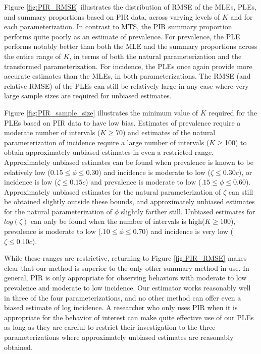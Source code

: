 \documentclass[man, noextraspace, floatsintext]{apa6}\usepackage[]{graphicx}\usepackage[]{color}
\begin{document}
Figure \ref{fig:PIR_RMSE} illustrates the distribution of RMSE of the MLEs, PLEs, and summary proportions based on PIR data, across varying levels of $K$ and for each parameterization. 
In contrast to MTS, the PIR summary proportion performs quite poorly as an estimate of prevalence. 
For prevalence, the PLE performs notably better than both the MLE and the summary proportions across the entire range of $K$, in terms of both the natural parameterization and the transformed parameterization. 
For incidence, the PLEs once again provide more accurate estimates than the MLEs, in both parameterizations. The RMSE (and relative RMSE) of the PLEs can still be relatively large in any case where very large sample sizes are required for unbiased estimates.

Figure \ref{fig:PIR_sample_size} illustrates the minimum value of $K$ required for the PLEs based on PIR data to have low bias. Estimates of prevalence require a moderate number of intervals ($K \geq 70$) and estimates of the natural parameterization of incidence require a large number of intervals ($K \geq $100) to obtain approximately unbiased estimates in even a restricted range. Approximately unbiased estimates can be found when prevalence is known to be relatively low ($0.15 \leq \phi \leq 0.30$) and incidence is moderate to low ($\zeta \leq 0.30c$), or incidence is low ($\zeta \leq 0.15c$) and prevalence is moderate to low ($.15 \leq \phi \leq 0.60$). Approximately unbiased estimates for the natural parameterization of $\zeta$ can still be obtained slightly outside these bounds, and approximately unbiased estimates for the natural parameterization of $\phi$ slightly farther still. Unbiased estimates for $log(\zeta)$ can only be found when the number of intervals is high($K \geq 100$), prevalence is moderate to low ($.10 \leq \phi \leq 0.70$) and incidence is very low ($\zeta \leq 0.10c$).

While these ranges are restrictive, returning to Figure \ref{fig:PIR_RMSE} makes clear that our method is superior to the only other summary method in use. In general, PIR is only appropriate for observing behaviors with moderate to low prevalence and moderate to low incidence. Our estimator works reasonably well in three of the four parameterizations, and no other method can offer even a biased estimate of log incidence. A researcher who only uses PIR when it is appropriate for the behavior of interest can make quite effective use of our PLEs as long as they are careful to restrict their investigation to the three parameterizations where approximately unbiased estimates are reasonably obtained.
\end{document}
